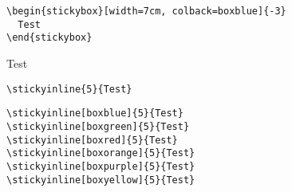 \documentclass[]{arbeitsblatt}
\begin{document}
\begin{verbatim}
\begin{stickybox}[width=7cm, colback=boxblue]{-3}
  Test
\end{stickybox}
\end{verbatim}

\begin{stickybox}[width=7cm, colback=boxblue]{-3}
  Test
\end{stickybox}



\begin{verbatim}
\stickyinline{5}{Test}
\end{verbatim}




\begin{verbatim}
\stickyinline[boxblue]{5}{Test}
\stickyinline[boxgreen]{5}{Test}
\stickyinline[boxred]{5}{Test}
\stickyinline[boxorange]{5}{Test}
\stickyinline[boxpurple]{5}{Test}
\stickyinline[boxyellow]{5}{Test}
\end{verbatim}

\end{document}

